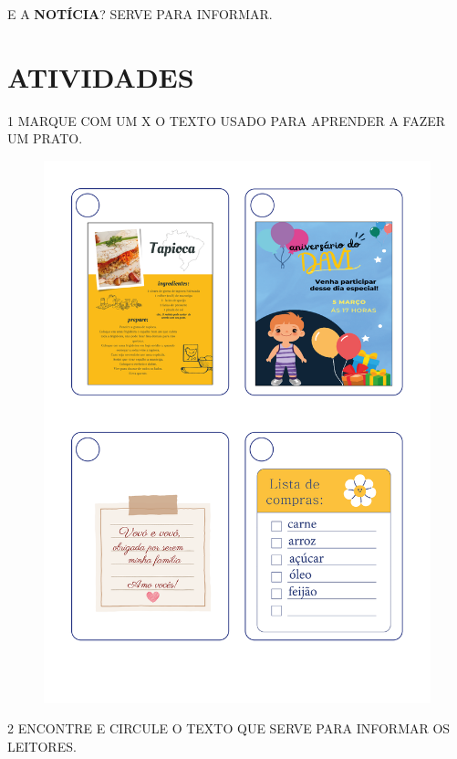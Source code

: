 {\vspace{0.5cm}

E A \textbf{NOTÍCIA}? SERVE PARA INFORMAR.
}


\section*{ATIVIDADES}

\num{1} MARQUE COM UM X O TEXTO USADO PARA APRENDER A FAZER UM PRATO.

\begin{figure}[H]
\centering
\includegraphics[width=.95\textwidth]{media/image137a140.png}
\end{figure}


\num{2} ENCONTRE E CIRCULE O TEXTO QUE SERVE PARA INFORMAR OS LEITORES. 

